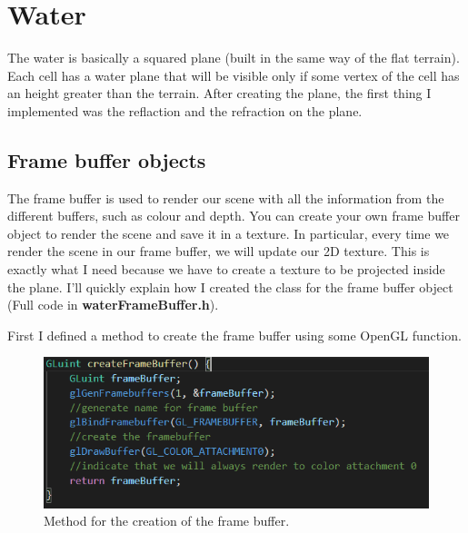 \section{Water}
The water is basically a squared plane (built in the same way of the flat terrain). Each cell has a water plane that will be visible only if some vertex of the cell has an height greater than the terrain.
After creating the plane, the first thing I implemented was the reflaction and the refraction on the plane.

\begin{figure}[hbt!]
	\centering
	\qquad
	\caption{}
\end{figure}

\subsection{Frame buffer objects}
The frame buffer is used to render our scene with all the information from the different buffers, such as colour and depth. You can create your own frame buffer object to render the scene and save it in a texture. In particular, every time we render the scene in our frame buffer, we will update our 2D texture. This is exactly what I need because we have to create a texture to be projected inside the plane.
I'll quickly explain how I created the class for the frame buffer object (Full code in \textbf{waterFrameBuffer.h}).

\newpage

\noindent
First I defined a method to create the frame buffer using some OpenGL function.

\begin{figure}[hbt!]
	\centering
	\includegraphics[width= 1
	\textwidth]{images/FBO1.png}
	\caption{Method for the creation of the frame buffer.}
\end{figure} 

